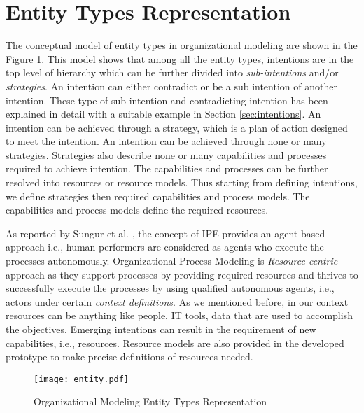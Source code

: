 \section{Entity Types Representation}
\label{sec:entitytypesrepresentation}

The conceptual model of entity types in organizational modeling are shown in the Figure \ref{fig:entitymodel}. This model shows that among all the entity types, intentions are in the top level of hierarchy which can be further divided into \textit{sub-intentions} and/or \textit{strategies}. An intention can either contradict or be a sub intention of another intention. These type of sub-intention and contradicting intention has been explained in detail with a suitable example in Section \ref{sec:intentions}.  An intention can be achieved through a strategy, which is a plan of action designed to meet the intention. An intention can be achieved through none or many strategies. Strategies also describe none or many capabilities and processes required to achieve intention. The capabilities and processes can be further resolved into resources or resource models. Thus starting from defining intentions, we define strategies then required capabilities and process models. The capabilities and process models define the required resources. 
 
As reported by Sungur et al. \cite{Sungur2014a}, the concept of IPE provides an agent-based approach i.e., human performers are considered as agents who execute the processes autonomously. Organizational Process Modeling is \textit{Resource-centric} approach as they support processes by providing required resources and thrives to successfully execute the processes by using qualified autonomous agents, i.e., actors under certain \textit{context definitions}.  As we mentioned before, in our context resources can be anything like people, IT tools, data that are used to accomplish the objectives. Emerging intentions can result in the requirement of new capabilities, i.e., resources. Resource models are also provided in the developed prototype to make precise definitions of resources needed.


\begin{figure}
	\centering
	\texttt{[image: entity.pdf]}
	\caption{Organizational Modeling Entity Types Representation}
	\label{fig:entitymodel}
\end{figure}

